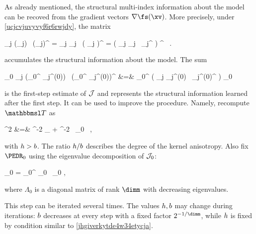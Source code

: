 \label{SEDRsa}
As already mentioned, the structural multi-index information about the model
can be recoved from the gradient vectors \( \nabla \fs(\xv) \).
More precisely, under \eqref{ucjcvjuvyvyf6r6rwjdy}, the matrix
\begin{EQA}[c]
	\JEDR
	\eqdef
	\sum_{j} \nabla \fs(\xv_{j}) \, \nabla \fs(\xv_{j})^{\T}
	=
	\sum_{j} \PEDR \fclv_{j} \, \bigl( \PEDR \fclv_{j} \bigr)^{\T}
	=
	\PEDR \biggl( \sum_{j} \fclv_{j} \, \fclv_{j}^{\T} \biggr) \PEDR^{\T}
	\, .
\end{EQA}
accumulates the structural information about the model.
The sum
\begin{EQA}
	\JEDR_{0}
	\eqdef 
	\sum_{j} (\BEDR_{0}^{\T} \fclv_{j}^{(0)}) \, (\BEDR_{0}^{\T} \fclv_{j}^{(0)})^{\T}
	&=&
	\BEDR_{0}^{\T} \Bigl( \sum_{j} \fclv_{j}^{(0)} \, {\fclv_{j}^{(0)}}^{\T} \Bigr) \BEDR_{0}
\label{uhehdisnckncw9ud9}
\end{EQA}
is the first-step estimate 
of \( \mathcal{J} \) and represents the structural information learned after the first step.
It can be used to improve the procedure.
Namely, recompute \( \TEDR \) as
\begin{EQA}
	\TEDR^{2}
	&=&
	\hiso^{-2} \Id_{\dimd} + \haniso^{-2} \, \JEDR_{0}
	\, ,
\label{yfijowjdo76dvuienk}
\end{EQA}
with \( h > b \).
The ratio \( h / b \) describes the degree of the kernel anisotropy.
Also fix \( \PEDR_{0} \) using the eigenvalue decomposition of \( \mathcal{J}_{0} \):
\begin{EQA}[c]
	\JEDR_{0}
	=
	\PEDR_{0}^{\T} \Lambda_{0} \, \PEDR_{0}
	\; ,
\end{EQA}
where \( \Lambda_{0} \) is a diagonal matrix of rank \( \dimm \) with decreasing eigenvalues.

This step can be iterated several times.
The values \( h, b \) may change during iterations: 
\( b \) decreases at every step with a fixed factor 
\( 2^{-1/\dimm} \), while \( h \) is fixed by condition similar to \eqref{jhgiverkytde4w34etycja}.


